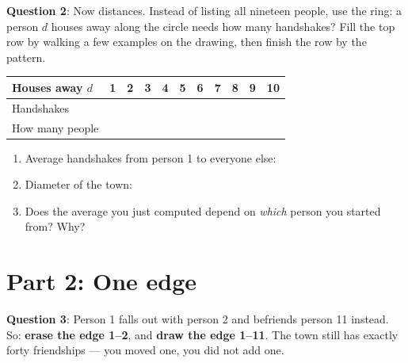 \documentclass[a4paper, 14pt]{extarticle}
\begin{document}
\begin{minipage}{\textwidth}
{\bf Question 2}:
Now distances. Instead of listing all nineteen people, use the ring: a person
$d$ houses away along the circle needs how many handshakes? Fill the top row by
walking a few examples on the drawing, then finish the row by the pattern.

\begin{center}
{\small
\begin{tabular}{|l|p{0.72cm}|p{0.72cm}|p{0.72cm}|p{0.72cm}|p{0.72cm}|p{0.72cm}|p{0.72cm}|p{0.72cm}|p{0.72cm}|p{0.72cm}|}
\hline
Houses away $d$ & 1 & 2 & 3 & 4 & 5 & 6 & 7 & 8 & 9 & 10 \\
\hline
Handshakes & & & & & & & & & & \\[0.5cm]
\hline
How many people & & & & & & & & & & \\[0.5cm]
\hline
\end{tabular}
}
\end{center}
\end{minipage}

\begin{enumerate}
    \item Average handshakes from person 1 to everyone else:
          \underline{\hspace{3cm}}
    \item Diameter of the town: \underline{\hspace{2cm}}
    \item Does the average you just computed depend on \emph{which} person you
          started from? Why?

          \underline{\hspace{\textwidth}}
\end{enumerate}

\clearpage

\section*{Part 2: One edge}

{\bf Question 3}:
Person 1 falls out with person 2 and befriends person 11 instead. So:
\textbf{erase the edge 1--2}, and \textbf{draw the edge 1--11}. The town still
has exactly forty friendships --- you moved one, you did not add one.

\begin{center}
\end{center}
\end{document}
